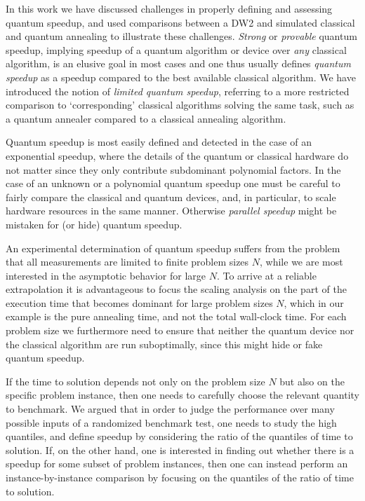 In this work we have discussed challenges in properly defining and assessing quantum speedup, and used comparisons between a DW2 and simulated classical and quantum annealing to illustrate these challenges. \emph{Strong} or \emph{provable} quantum speedup, implying speedup of a quantum algorithm or device over \emph{any} classical algorithm, is an elusive goal in most cases and one thus usually defines \emph{quantum speedup} as a speedup compared to the best available classical algorithm. We have introduced the notion of \emph{limited quantum speedup}, referring to a more restricted comparison to `corresponding' classical algorithms solving the same task, such as a quantum annealer compared to a classical annealing algorithm.

Quantum speedup is most easily defined and detected in the case of an exponential speedup, where the details of the quantum or classical hardware do not matter since they only contribute subdominant polynomial factors. In the case of an unknown or a polynomial quantum speedup one must be careful to fairly compare the classical and quantum devices, and, in particular, to scale hardware resources in the same manner. Otherwise \emph{parallel speedup} might be mistaken for (or hide) quantum speedup.

An experimental determination of quantum speedup suffers from the problem that all measurements are limited to finite problem sizes $N$, while we are most interested in the asymptotic behavior for large $N$. To arrive at a reliable extrapolation it is advantageous to focus the scaling analysis on the part of the execution time that becomes dominant for large problem sizes $N$, which in our example is the pure annealing time, and not the total wall-clock time. For each problem size we furthermore need to ensure that neither the quantum device nor the classical algorithm are run suboptimally, since this might hide or fake quantum speedup.

If the time to solution depends not only on the problem size $N$ but also on the specific problem instance, then one needs to carefully choose the relevant quantity to benchmark. We argued that in order to judge the performance over many possible inputs of a randomized benchmark test, one needs to study the high quantiles, and define speedup by considering the ratio of the quantiles of time to solution. If, on the other hand, one is interested in finding out whether there is a speedup for some subset of problem instances, then one can instead perform an instance-by-instance comparison by focusing on the quantiles of the ratio of time to solution.

